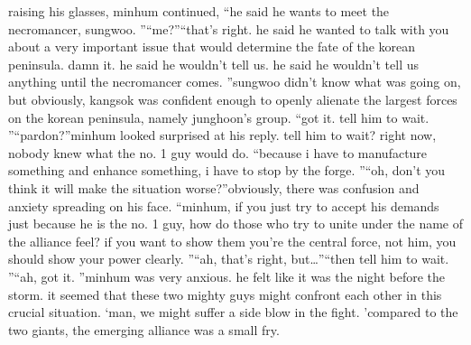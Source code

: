 raising his glasses, minhum continued, “he said he wants to meet the necromancer, sungwoo.
”“me?”“that’s right.
 he said he wanted to talk with you about a very important issue that would determine the fate of the korean peninsula.
 damn it.
 he said he wouldn’t tell us.
 he said he wouldn’t tell us anything until the necromancer comes.
”sungwoo didn’t know what was going on, but obviously, kangsok was confident enough to openly alienate the largest forces on the korean peninsula, namely junghoon’s group.
“got it.
 tell him to wait.
”“pardon?”minhum looked surprised at his reply.
 tell him to wait? right now, nobody knew what the no.
 1 guy would do.
“because i have to manufacture something and enhance something, i have to stop by the forge.
”“oh, don’t you think it will make the situation worse?”obviously, there was confusion and anxiety spreading on his face.
“minhum, if you just try to accept his demands just because he is the no.
 1 guy, how do those who try to unite under the name of the alliance feel? if you want to show them you’re the central force, not him, you should show your power clearly.
”“ah, that’s right, but…”“then tell him to wait.
”“ah, got it.
”minhum was very anxious.
 he felt like it was the night before the storm.
it seemed that these two mighty guys might confront each other in this crucial situation.
‘man, we might suffer a side blow in the fight.
’compared to the two giants, the emerging alliance was a small fry.


 